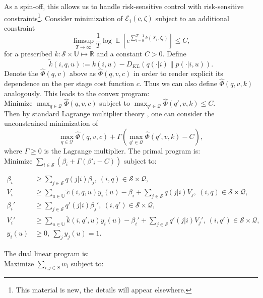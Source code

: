 \documentclass[notitlepage,11pt,reqno]{amsart}
\numberwithin{equation}{section}
\theoremstyle{plain}
\theoremstyle{definition}
\theoremstyle{remark}
\newcommand{\Act}{{\mathds{U}}}
\newcommand{\sE}{{\mathscr{E}}}     %
\newcommand{\cS}{{\mathcal{S}}}     %
\newcommand{\RR}{\mathds{R}} %
\DeclareMathOperator{\Exp}{\mathbb{E}} %
\begin{document}
As a spin-off, this allows us to handle risk-sensitive control with risk-sensitive constraints\footnote{This material is new, the details will appear elsewhere.}. Consider minimization of $\sE_i(c, \zeta)$ subject to an additional constraint
\begin{equation}\label{constraint}
\limsup_{T\to\infty}\frac{1}{T}\log\Exp\left[e^{\sum_{t=0}^{T-1}k(X_t,\zeta_t)}\right] \leq C, 
\end{equation}
for a prescribed $k: \cS\times\Act \mapsto \RR$ and a constant $C > 0$. Define
$$\tilde{k}(i,q,u) := k(i,u) - D_{KL}(q(\cdot|i)\|p(\cdot|i,u)).$$  Denote the $\widehat\Phi(q,v)$ above as $\widehat\Phi(q,v,c)$ in order to render explicit its dependence on the per stage cost function $c$. Thus we can also define $\widehat\Phi(q,v,k)$ analogously. This leads to the convex program:\\

\noindent Minimize $\max_{q\in\mathcal{Q}}\widehat\Phi(q,v,c)$ subject to $\max_{q'\in\mathcal{Q}}\widehat\Phi(q',v,k) \leq C.$\\

Then by standard Lagrange multiplier theory \cite{MR0238472}, one can consider the unconstrained minimization of
$$\max_{q\in\mathcal{Q}}\widehat\Phi(q,v,c) + \Gamma(\max_{q'\in\mathcal{Q}}\widehat\Phi(q',v,k) - C),$$
where $\Gamma \geq 0$ is the Lagrange multiplier. The primal program is:\\

\noindent  Minimize $\sum_{i\in\cS}(\beta_i + \Gamma(\beta'_i - C))$ subject to:

\begin{align*}
\beta_i &\geq \sum_{j\in\cS}q(j|i)\beta_j, \ (i,q)\in\cS\times\mathcal{Q},
\\
V_i &\geq \sum_{u\in\Act}\tilde{c}(i,q,u)y_i(u) - \beta_i + \sum_{j\in\cS}q(j|i)V_j, \ (i,q) \in \cS\times\mathcal{Q},
\\
\beta_i' &\geq \sum_{j\in\cS}q'(j|i)\beta_j', \ (i,q')\in\cS\times\mathcal{Q},
\\
V_i' &\geq \sum_{u\in\Act}\tilde{k}(i,q',u)y_i(u) - \beta_i' + \sum_{j\in\cS}q'(j|i)V_j', \ (i,q') \in \cS\times\mathcal{Q},
\\
y_i(u)&\geq 0, \ \sum_j y_j(u) = 1.
\end{align*}


The dual linear program is: \\

\noindent Maximize $\sum_{i,j\in S}w_{i}$ subject to:
\end{document}
